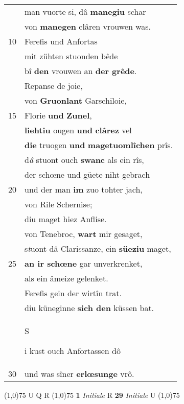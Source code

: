 \documentclass[8pt,a4paper,notitlepage]{article}
\begin{document}
\begin{table}[ht]
\begin{minipage}[t]{0.5\linewidth}
\begin{tabular}{rl}
 & man vuorte si, dâ \textbf{manegiu} schar\\ 
 & von \textbf{manegen} clâren vrouwen was.\\ 
10 & Ferefis und Anfortas\\ 
 & mit zühten stuonden bêde\\ 
 & bî \textbf{den} vrouwen an \textbf{der grêde}.\\ 
 & Repanse de joie,\\ 
 & von \textbf{Gruonlant} Garschiloie,\\ 
15 & Florie \textbf{und} \textbf{Zunel},\\ 
 & \textbf{liehtiu} ougen \textbf{und} \textbf{clârez} vel\\ 
 & \textbf{die} truogen \textbf{und} \textbf{magetuomlîchen} prîs.\\ 
 & d\textit{â} stuont ouch \textbf{swanc} als ein rîs,\\ 
 & der schœne und güete niht gebrach\\ 
20 & und der man \textbf{im} zuo tohter jach,\\ 
 & von Rile Schernise;\\ 
 & diu maget hiez Anflise.\\ 
 & von Tenebroc, \textbf{wart} mir gesaget,\\ 
 & s\textit{t}uont dâ Clarissanze, ein \textbf{süeziu} maget,\\ 
25 & \textbf{an ir schœne} gar unverkrenket,\\ 
 & als ein âmeize gelenket.\\ 
 & Ferefis gein der wirtîn trat.\\ 
 & diu küneginne \textbf{sich den} küssen bat.\\ 
 & \begin{large}S\end{large}i kust ouch Anfortassen dô\\ 
30 & und was sîner \textbf{erlœsunge} vrô.\\ 
\end{tabular}
\scriptsize
\line(1,0){75} \newline
U Q R \newline
\line(1,0){75} \newline
\textbf{1} \textit{Initiale} R  \textbf{29} \textit{Initiale} U  \newline
\line(1,0){75} \newline

\end{minipage}
\end{table}
\end{document}
